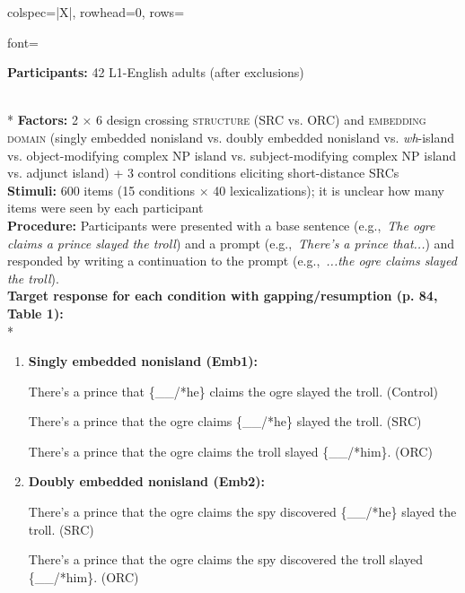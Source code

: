 \begin{longtblr}[caption={\textcite{morgan.wagers2018}: Written RC elicitation task}, label={tblr:morgan-wagers}]{colspec={|X|}, rowhead=0, rows={font=\raggedright{}}}\hline
\textbf{Participants:} 42 L1-English adults (after exclusions) \vspace{5pt}\rule{0pt}{10pt}\\*
\textbf{Factors:} 2 × 6 design crossing \textsc{structure} (SRC vs. ORC) and \textsc{embedding domain} (singly embedded nonisland vs. doubly embedded nonisland vs. \textit{wh}-island vs. object-modifying complex NP island vs. subject-modifying complex NP island vs. adjunct island) + 3 control conditions eliciting short-distance SRCs \vspace{5pt}\\
\textbf{Stimuli:} 600 items (15 conditions × 40 lexicalizations); it is unclear how many items were seen by each participant \vspace{5pt}\\
\textbf{Procedure:} Participants were presented with a base sentence (e.g.,~\textit{The ogre claims a prince slayed the troll}) and a prompt (e.g.,~\textit{There's a prince that...}) and responded by writing a continuation to the prompt (e.g.,~\textit{...the ogre claims slayed the troll}). \vspace{5pt}\\
\textbf{Target response for each condition with gapping/resumption (p. 84, Table 1):} \vspace{5pt}\\*
\begin{varwidth}{\linewidth}\begin{enumerate}[\bfseries (a),itemsep=5pt] 
\item \textbf{Singly embedded nonisland (Emb1):}\par\nobreak
There's a prince that \{\_\_/*he\} claims the ogre slayed the troll. (Control)\par\nobreak
There's a prince that the ogre claims \{\_\_/*he\} slayed the troll. (SRC)\par\nobreak
There's a prince that the ogre claims the troll slayed \{\_\_/*him\}. (ORC)
\item \textbf{Doubly embedded nonisland (Emb2):}\par\nobreak
There's a prince that the ogre claims the spy discovered \{\_\_/*he\} slayed the troll. (SRC)\par\nobreak
There's a prince that the ogre claims the spy discovered the troll slayed \{\_\_/*him\}. (ORC)

\end{enumerate}
\end{varwidth}
\end{longtblr}
